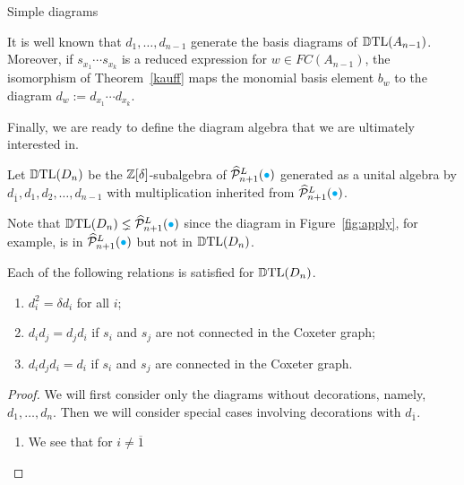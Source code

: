 \begin{section}{Simple diagrams}

\begin{remark}
It is well known that $d_1,\ldots ,d_{n-1}$ generate the basis diagrams of $\operatorname{\mathbb{D}TL}(A_{n-1})$. Moreover, if $s_{x_1} \cdots s_{x_k}$ is a reduced expression for $w\in FC(A_{n-1})$, the isomorphism of Theorem~\ref{kauff} maps the monomial basis element $b_w$ to the diagram $d_w:=d_{x_1}\cdots d_{x_k}$.
\end{remark}

Finally, we are ready to define the diagram algebra that we are ultimately interested in.  

\begin{definition}\label{def:D_n}
\rm Let $\operatorname{\mathbb{D}TL}(D_{n})$ be the $\mathbb{Z}[\delta]$-subalgebra of $\widehat{\mathcal{P}}_{n+1}^{L}({\color{cyan}\bullet})$ generated as a unital algebra by $d_{\overline{1}}, d_{1}, d_{2}, \dots, d_{n-1}$ with multiplication inherited from $\widehat{\mathcal{P}}_{n+1}^{L}({\color{cyan}\bullet})$.
\end{definition}

Note that $\operatorname{\mathbb{D}TL}(D_{n})\lneq \widehat{\mathcal{P}}_{n+1}^{L}({\color{cyan}\bullet})$ since the diagram in Figure~\ref{fig:apply}, for example, is in $\widehat{\mathcal{P}}_{n+1}^{L}({\color{cyan}\bullet})$ but not in $\operatorname{\mathbb{D}TL}(D_{n})$.

\begin{proposition}\label{rem:D relations hold}
\rm Each of the following relations is satisfied for $\operatorname{\mathbb{D}TL}(D_{n})$.
\begin{enumerate}[leftmargin=0.6in]
\item $d_{i}^{2}=\delta d_{i}$ for all $i$;
\item $d_{i}d_{j}=d_{j}d_{i}$ if $s_i$ and $s_j$ are not connected in the Coxeter graph;
\item $d_{i}d_{j}d_{i}=d_{i}$ if $s_i$ and $s_j$ are connected in the Coxeter graph.
\end{enumerate}
\end{proposition}

\begin{proof}
We will first consider only the diagrams without decorations, namely, $d_1,\ldots ,d_n$. Then we will consider special cases involving decorations with $d_{\overline{1}}$.
\begin{enumerate}[leftmargin=0.6in]
\item We see that for $i\neq \overline{1}$


\end{enumerate}
\end{proof}
\end{section}
